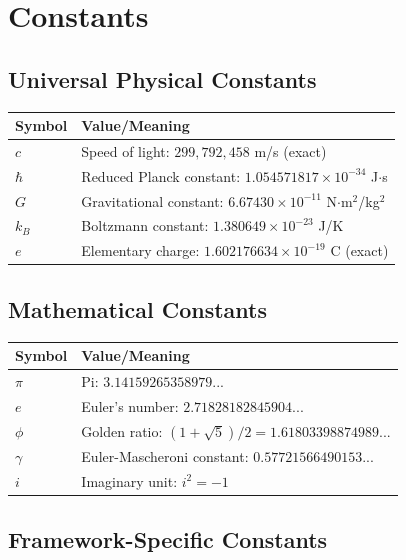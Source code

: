 \section*{Constants}

\subsection*{Universal Physical Constants}

\begin{center}
\begin{tabular}{ll}
\toprule
\textbf{Symbol} & \textbf{Value/Meaning} \\
\midrule
$c$ & Speed of light: $299{,}792{,}458$ m/s (exact) \\
$\hbar$ & Reduced Planck constant: $1.054571817 \times 10^{-34}$ J$\cdot$s \\
$G$ & Gravitational constant: $6.67430 \times 10^{-11}$ N$\cdot$m$^2$/kg$^2$ \\
$k_B$ & Boltzmann constant: $1.380649 \times 10^{-23}$ J/K \\
$e$ & Elementary charge: $1.602176634 \times 10^{-19}$ C (exact) \\
\bottomrule
\end{tabular}
\end{center}

\subsection*{Mathematical Constants}

\begin{center}
\begin{tabular}{ll}
\toprule
\textbf{Symbol} & \textbf{Value/Meaning} \\
\midrule
$\pi$ & Pi: $3.14159265358979...$ \\
$e$ & Euler's number: $2.71828182845904...$ \\
$\phi$ & Golden ratio: $(1 + \sqrt{5})/2 = 1.61803398874989...$ \\
$\gamma$ & Euler-Mascheroni constant: $0.57721566490153...$ \\
$i$ & Imaginary unit: $i^2 = -1$ \\
\bottomrule
\end{tabular}
\end{center}

\subsection*{Framework-Specific Constants}

